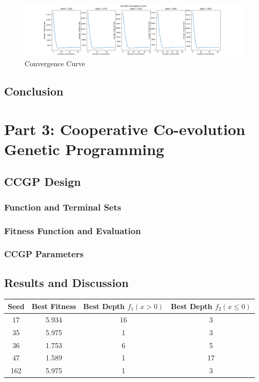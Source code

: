 \documentclass{article}
\begin{document}
\begin{figure}[h!]
	\centering
	\includegraphics[width=\linewidth]{knapsack_100_995.png}
	\caption{Convergence Curve}
\end{figure}

\subsection*{Conclusion}

\section*{Part 3: Cooperative Co-evolution Genetic Programming}
\subsection*{CCGP Design}
\subsubsection*{Function and Terminal Sets}
\subsubsection*{Fitness Function and Evaluation}
\subsubsection*{CCGP Parameters}
\subsection*{Results and Discussion}

\begin{center}
	\begin{tabular}{|c|c|c|c|}
		\hline
		Seed & Best Fitness & Best Depth $f_1(x > 0)$ & Best Depth $f_2(x \le 0)$ \\
		\hline
		17 & 5.934 & 16 & 3 \\
		\hline
		35 & 5.975 & 1 & 3 \\
		\hline
		36 & 1.753 & 6 & 5 \\
		\hline
		47 & 1.589 & 1 & 17 \\
		\hline
		162 & 5.975 & 1 & 3 \\
		\hline
	\end{tabular}
\end{center}
\end{document}
